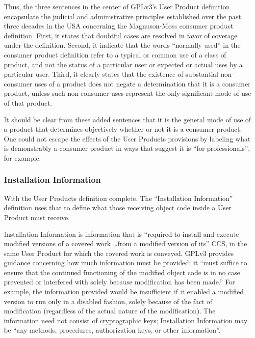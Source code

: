 Thus, the three sentences in the center of GPLv3's User Product definition
encapsulate the judicial and administrative principles established over the
past three decades in the USA concerning the Magnuson-Moss consumer product
definition.  First, it states that doubtful cases are resolved in favor of
coverage under the definition.  Second, it indicate that the words ``normally
used'' in the consumer product definition refer to a typical or common use of
a class of product, and not the status of a particular user or expected or
actual uses by a particular user.  Third, it clearly states that the
existence of substantial non-consumer uses of a product does not negate a
determination that it is a consumer product, unless such non-consumer uses
represent the only significant mode of use of that product.

It should be clear from these added sentences that it is the general mode of
use of a product that determines objectively whether or not it is a consumer
product.  One could not escape the effects of the User Products provisions by
labeling what is demonstrably a consumer product in ways that suggest it is
``for professionals'', for example.


\subsubsection{Installation Information}

\label{GPLv3-installation-information}

With the User Products definition complete,  The ``Installation Information''
definition uses that to define what those receiving object code inside a User
Product must receive.

Installation Information is information that is ``required to install and
execute modified versions of a covered work \dots from a modified version of
its'' CCS, in the same User Product for which the covered work is conveyed.
GPLv3 provides guidance concerning how much information must be provided: it
``must suffice to ensure that the continued functioning of the modified
object code is in no case prevented or interfered with solely because
modification has been made.''  For example, the information provided would be
insufficient if it enabled a modified version to run only in a disabled
fashion, solely because of the fact of modification (regardless of the actual
nature of the modification).  The information need not consist of
cryptographic keys; Installation Information may be ``any methods,
procedures, authorization keys, or other information''.

